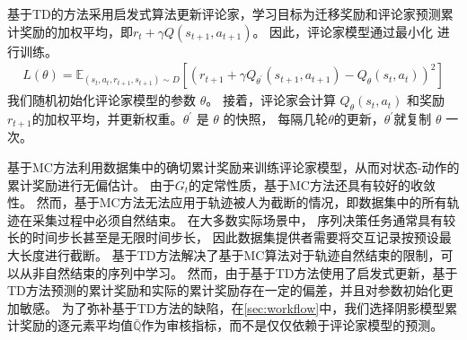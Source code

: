 基于TD的方法采用启发式算法更新评论家，学习目标为迁移奖励和评论家预测累计奖励的加权平均，即$r_{t}+\gamma Q\left(s_{t+1}, a_{t+1}\right)$。
因此，评论家模型通过最小化 进行训练。
\begin{equation}
    \label{eq:td critic}
    \begin{aligned}
    L(\theta)=\mathbb{E}_{\left(s_t, a_t, r_{t+1}, s_{t+1}\right) \sim D}\left[\left(r_{t+1}+\gamma Q_{\theta^{\prime}}\left(s_{t+1}, a_{t+1}\right)-Q_\theta\left(s_t, a_t\right)\right)^2\right]
    \end{aligned}
\end{equation}
我们随机初始化评论家模型的参数 $\theta$。
接着，评论家会计算 $Q_\theta\left(s_t, a_t\right)$ 和奖励 $r_{t+1}$的加权平均，并更新权重。$\theta^\prime$ 是 $\theta$ 的快照，
每隔几轮$\theta$的更新，$\theta^\prime$就复制 $\theta$ 一次。

基于MC方法利用数据集中的确切累计奖励来训练评论家模型，从而对状态-动作的累计奖励进行无偏估计。
由于$G_t$的定常性质，基于MC方法还具有较好的收敛性。
然而，基于MC方法无法应用于轨迹被人为截断的情况，即数据集中的所有轨迹在采集过程中必须自然结束。
在大多数实际场景中，
序列决策任务通常具有较长的时间步长甚至是无限时间步长，
因此数据集提供者需要将交互记录按预设最大长度进行截断。
基于TD方法解决了基于MC算法对于轨迹自然结束的限制，可以从非自然结束的序列中学习。
然而，由于基于TD方法使用了启发式更新，基于TD方法预测的累计奖励和实际的累计奖励存在一定的偏差，并且对参数初始化更加敏感。
为了弥补基于TD方法的缺陷，在\autoref{sec:workflow}中，我们选择阴影模型累计奖励的逐元素平均值$\bar{\mathbb{Q}}$作为审核指标，而不是仅仅依赖于评论家模型的预测。

